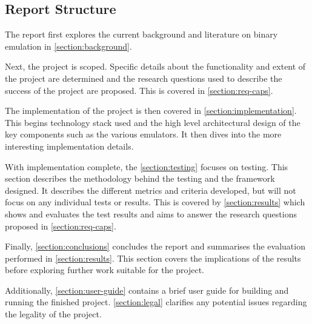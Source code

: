 \subsection{Report Structure}

The report first explores the current background and literature on binary emulation in \autoref{section:background}.

Next, the project is scoped. Specific details about the functionality and extent of the project are determined and the research questions used to describe the success of the project are proposed. This is covered in \autoref{section:req-caps}.

The implementation of the project is then covered in \autoref{section:implementation}. This begins technology stack used and the high level architectural design of the key components such as the various emulators. It then dives into the more interesting implementation details.

With implementation complete, the \autoref{section:testing} focuses on testing. This section describes the methodology behind the testing and the framework designed. It describes the different metrics and criteria developed, but will not focus on any individual tests or results. This is covered by \autoref{section:results} which shows and evaluates the test results and aims to answer the research questions proposed in \autoref{section:req-caps}.

Finally, \autoref{section:conclusions} concludes the report and summarises the evaluation performed in \autoref{section:results}. This section covers the implications of the results before exploring further work suitable for the project.

Additionally, \autoref{section:user-guide} contains a brief user guide for building and running the finished project. \autoref{section:legal} clarifies any potential issues regarding the legality of the project.
